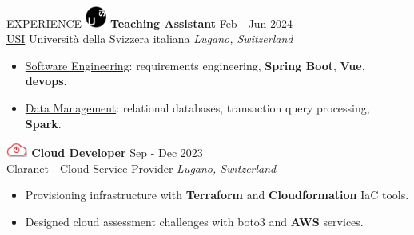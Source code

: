 \documentclass{cv} %
\def\intraexpvspace{0.15cm}
\begin{document}
\begin{minipage}[b][0.9\paperheight][t]{0.7\linewidth}
\begin{rSection}{EXPERIENCE}
        \includegraphics[width=0.7cm, trim={0cm 10cm 0cm 0cm}]{usi-icon.png}
        \hspace*{0cm}\textbf{Teaching Assistant} \hfill Feb - Jun 2024\\
        \hspace*{0.85cm}\href{https://www.usi.ch/}{USI} Università della Svizzera italiana
        \hfill \textit{Lugano, Switzerland}
        \begin{itemize}
            \item \href{https://search.usi.ch/it/corsi/35268192/software-atelier-4-software-engineering-project}{Software Engineering}:
                  requirements engineering, \textbf{Spring Boot}, \textbf{Vue}, \textbf{devops}.

            \item \href{https://search.usi.ch/it/corsi/35268184/data-management}{Data Management}:
                  relational databases, transaction query processing, \textbf{Spark}.
        \end{itemize}
        \vspace{\intraexpvspace}
        \vspace{\intraexpvspace}

        \includegraphics[width=0.7cm, trim={0cm 15cm 0cm 0cm}]{claranet-logo.png}
        \textbf{Cloud Developer} \hfill Sep - Dec 2023\\
        \hspace*{0.85cm}\href{https://www.claranet.com/}{Claranet} - Cloud Service Provider
        \hfill \textit{Lugano, Switzerland}
        \begin{itemize}
            \item Provisioning infrastructure with \textbf{Terraform} and \textbf{Cloudformation}
                  IaC tools.

            \item Designed cloud assessment challenges with boto3 and \textbf{AWS} services.
        \end{itemize}
        \vspace{\intraexpvspace}
        \vspace{\intraexpvspace}


\end{rSection}
\end{minipage}
\end{document}
